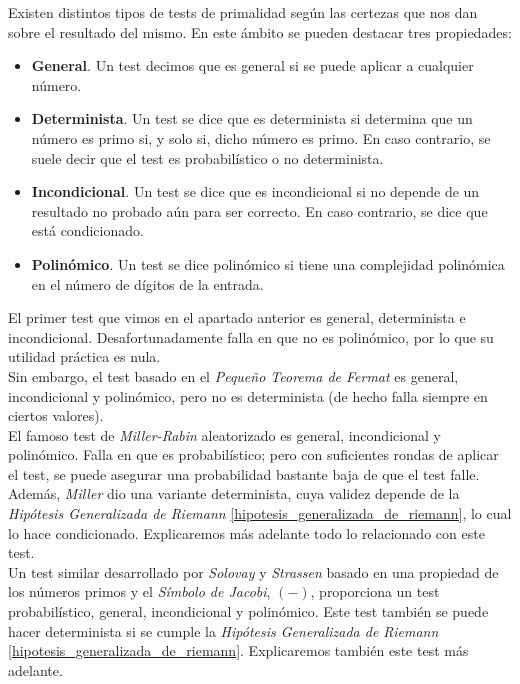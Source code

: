 Existen distintos tipos de tests de primalidad según las certezas que nos dan sobre el resultado del mismo. En este ámbito se pueden destacar tres propiedades:

\begin{itemize}
	\item \textbf{General}. Un test decimos que es general si se puede aplicar a cualquier número.
	
	\item \textbf{Determinista}. Un test se dice que es determinista si determina que un número es primo si, y solo si, dicho número es primo. En caso contrario, se suele decir que el test es probabilístico o no determinista.
	
	\item \textbf{Incondicional}. Un test se dice que es incondicional si no depende de un resultado no probado aún para ser correcto. En caso contrario, se dice que está condicionado.
	
	\item \textbf{Polinómico}. Un test se dice polinómico si tiene una complejidad polinómica en el número de dígitos de la entrada.
\end{itemize}

El primer test que vimos en el apartado anterior es general, determinista e incondicional. Desafortunadamente falla en que no es polinómico, por lo que su utilidad práctica es nula.\\

Sin embargo, el test basado en el \textit{Pequeño Teorema de Fermat} es general, incondicional y polinómico, pero no es determinista (de hecho falla siempre en ciertos valores).\\

El famoso test de \textit{Miller-Rabin} aleatorizado es general, incondicional y polinómico. Falla en que es probabilístico; pero con suficientes rondas de aplicar el test, se puede asegurar una probabilidad bastante baja de que el test falle. Además, \textit{Miller} dio una variante determinista, cuya validez depende de la \textit{Hipótesis Generalizada de Riemann} \ref{hipotesis_generalizada_de_riemann}, lo cual lo hace condicionado. Explicaremos más adelante todo lo relacionado con este test.\\

Un test similar desarrollado por \textit{Solovay} y \textit{Strassen} basado en una propiedad de los números primos y el \textit{Símbolo de Jacobi}, $(-)$, proporciona un test probabilístico, general, incondicional y polinómico. Este test también se puede hacer determinista si se cumple la \textit{Hipótesis Generalizada de Riemann} \ref{hipotesis_generalizada_de_riemann}. Explicaremos también este test más adelante.\\

